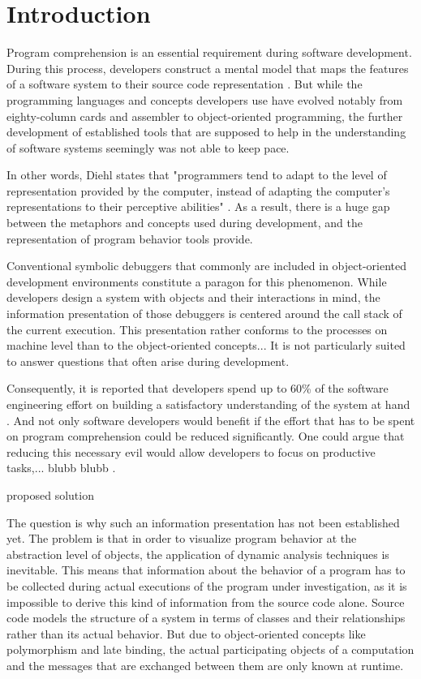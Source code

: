 \chapter{Introduction}
\label{c:introduction}

Program comprehension is an essential requirement during software development.
During this process, developers construct a mental model that maps the features of a software system to their source code representation \cite{latoza_maintaining_2006}.
But while the programming languages and concepts developers use have evolved notably from eighty-column cards and assembler to object-oriented programming, the further development of established tools that are supposed to help in the understanding of software systems seemingly was not able to keep pace.

In other words, Diehl states that "programmers tend to adapt to the level of representation provided by the computer, instead of adapting the computer's representations to their perceptive abilities" \cite{diehl_software_2007}.
As a result, there is a huge gap between the metaphors and concepts used during development, and the representation of program behavior tools provide.

Conventional symbolic debuggers that commonly are included in object-oriented development environments constitute a paragon for this phenomenon.
While developers design a system with objects and their interactions in mind, the information presentation of those debuggers is centered around the call stack of the current execution.
This presentation rather conforms to the processes on machine level than to the object-oriented concepts...
It is not particularly suited to answer questions that often arise during development.

Consequently, it is reported that developers spend up to 60\% of the software engineering effort on building a satisfactory understanding of the system at hand \cite{corbi_program_1989, basili_evolving_1997, ducasse_class_2005, rothlisberger_feature_2007, cornelissen_execution_2008}.
And not only software developers would benefit if the effort that has to be spent on program comprehension could be reduced significantly.
One could argue that reducing this necessary evil would allow developers to focus on productive tasks,... blubb blubb .

proposed solution 

The question is why such an information presentation has not been established yet.
The problem is that in order to visualize program behavior at the abstraction level of objects, the application of dynamic analysis techniques is inevitable.
This means that information about the behavior of a program has to be collected during actual executions of the program under investigation, as it is impossible to derive this kind of information from the source code alone.
Source code models the structure of a system in terms of classes and their relationships rather than its actual behavior.
But due to object-oriented concepts like polymorphism and late binding, the actual participating objects of a computation and the messages that are exchanged between them are only known at runtime.

